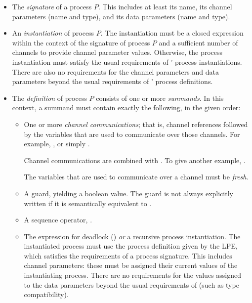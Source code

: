 \begin{itemize}

\item The \emph{signature} of a process $P$.
This includes at least its name, its channel parameters (name and type), and its data parameters (name and type).

\item An \emph{instantiation} of process $P$.
The instantiation must be a closed expression within the context of the signature of process $P$ and a sufficient number of channels to provide channel parameter values.
Otherwise, the process instantiation must satisfy the usual requirements of \txs{}' process instantiations.
There are also no requirements for the channel parameters and data parameters beyond the usual requirements of \txs{}' process definitions.

\item The \emph{definition} of process $P$ consists of one or more \emph{summands}.
In this context, a summand must contain exactly the following, in the given order:

\begin{itemize}

\item One or more \emph{channel communications}; that is, channel references followed by the variables that are used to communicate over those channels.
For example, , or simply .

Channel communications are combined with \inlinecode{|}.
To give another example, .

The variables that are used to communicate over a channel must be \emph{fresh}.

\item A guard, yielding a boolean value.
The guard is not always explicitly written if it is semantically equivalent to .

\item A sequence operator, \inlinecode{>->}.

\item The expression for deadlock () \emph{or} a recursive process instantiation.
The instantiated process must use the process definition given by the LPE, which satisfies the requirements of a \txs{} process signature.
This includes channel parameters: these must be assigned their current values of the instantiating process.
There are no requirements for the values assigned to the data parameters beyond the usual requirements of \txs{} (such as type compatibility).

\end{itemize}

\end{itemize}

